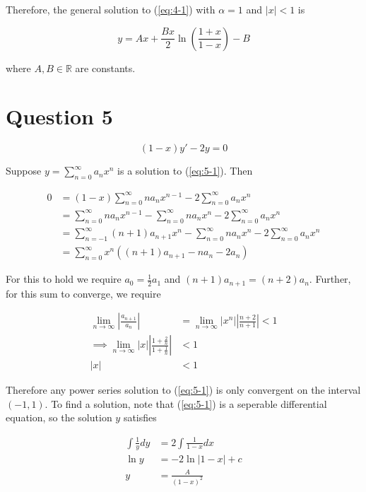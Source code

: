 \documentclass{article}
\begin{document}
Therefore, the general solution to (\ref{eq:4-1}) with $\alpha = 1$ and $|x| < 1$ is

\begin{equation*}
    y = Ax + \frac{Bx}{2}\ln\left(\frac{1 + x}{1 - x}\right) - B
\end{equation*}

where $A, B \in \mathbb{R}$ are constants.

\section*{Question 5}

\begin{equation} \label{eq:5-1}
    (1 - x)y' - 2y = 0
\end{equation}

Suppose $y = \sum_{n = 0}^\infty a_n x^n$ is a solution to (\ref{eq:5-1}). Then

\begin{align*}
    0 &= (1 - x)\sum_{n = 0}^\infty na_nx^{n - 1} - 2\sum_{n = 0}^\infty a_nx^n\\
    &= \sum_{n = 0}^\infty na_nx^{n - 1} - \sum_{n = 0}^\infty na_nx^n - 2\sum_{n = 0}^\infty a_nx^n\\
    &= \sum_{n = -1}^\infty (n + 1)a_{n + 1}x^{n} - \sum_{n = 0}^\infty na_nx^n - 2\sum_{n = 0}^\infty a_nx^n\\
    &= \sum_{n = 0}^\infty x^n((n + 1)a_{n + 1} - na_n - 2a_n)
\end{align*}

For this to hold we require $a_0 = \frac{1}{2}a_1$ and $(n + 1)a_{n + 1} = (n + 2)a_n$. Further, for this sum to converge, we require

\begin{align*}
    \lim\limits_{n \to \infty} \left|\frac{a_{n + 1}}{a_n}\right| &= \lim\limits_{n \to \infty} |x^n|\left|\frac{n + 2}{n + 1}\right| < 1\\
    \implies \lim\limits_{n \to \infty} |x|\left|\frac{1 + \frac{2}{n}}{1 + \frac{1}{n}}\right| &< 1\\
    |x| &< 1
\end{align*}

Therefore any power series solution to (\ref{eq:5-1}) is only convergent on the interval $(-1, 1)$. To find a solution, note that (\ref{eq:5-1})
is a seperable differential equation, so the solution $y$ satisfies

\begin{align*}
    \int \frac{1}{y} dy &= 2\int \frac{1}{1 - x} dx\\
    \ln y &= -2\ln|1 - x| + c\\
    y &= \frac{A}{(1 - x)^2}
\end{align*}
\end{document}
